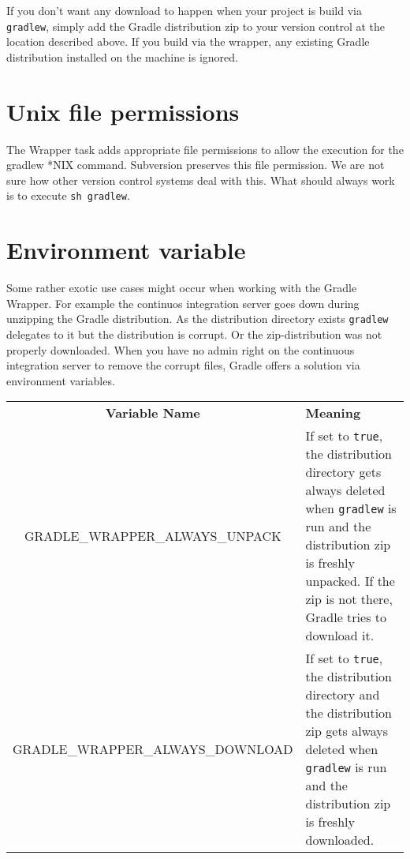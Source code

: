 If you don't want any download to happen when your project is build via \texttt{gradlew}, simply add the Gradle distribution zip to your version control at the location described above. If you build via the wrapper, any existing Gradle distribution installed on the machine is ignored.

\section{Unix file permissions} %
\label{sec:unix_file_permissions}
The Wrapper task adds appropriate file permissions to allow the execution for the gradlew *NIX command. Subversion preserves this file permission. We are not sure how other version control systems deal with this. What should always work is to execute \texttt{sh gradlew}. 


\section{Environment variable} %
\label{sec:environment_variable}
Some rather exotic use cases might occur when working with the Gradle Wrapper. For example the continuos integration server goes down during unzipping the Gradle distribution. As the distribution directory exists \texttt{gradlew} delegates to it but the distribution is corrupt. Or the zip-distribution was not properly downloaded. When you have no admin right on the continuous integration server to remove the corrupt files, Gradle offers a solution via environment variables.

\begin{tabularx}{\textwidth}{cX} 
	\textbf{Variable Name} & \centerline{\textbf{Meaning}}\\
    GRADLE\_WRAPPER\_ALWAYS\_UNPACK & If set to \texttt{true}, the distribution directory gets always deleted when \texttt{gradlew} is run and the distribution zip is freshly unpacked. If the zip is not there, Gradle tries to download it. \\
	GRADLE\_WRAPPER\_ALWAYS\_DOWNLOAD & If set to \texttt{true}, the distribution directory and the distribution zip gets always deleted when \texttt{gradlew} is run and the distribution zip is freshly downloaded. \\
\end{tabularx}

